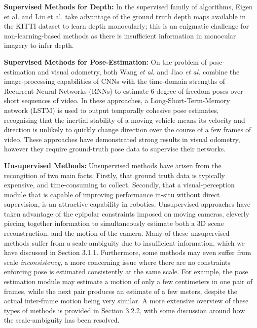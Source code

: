 \textbf{Supervised Methods for Depth: } In the supervised family of algorithms, Eigen et al. \cite{eigen2014supervised} and Liu et al. \cite{liu2015supervised} take advantage of the ground truth depth maps available in the KITTI dataset to learn depth monocularly; this is an enigmatic challenge for non-learning-based methods as there is insufficient information in monocular imagery to infer depth.

\textbf{Supervised Methods for Pose-Estimation: } On the problem of pose-estimation and visual odometry, both Wang \textit{et al.} \cite{wang2017deepvo} and Jiao \textit{et al.} \cite{jiao2018magicvo} combine the image-processing capabilities of CNNs with the time-domain strengths of Recurrent Neural Networks (RNNs) to estimate 6-degree-of-freedom poses over short sequences of video. In these approaches, a Long-Short-Term-Memory network (LSTM) is used to output temporally cohesive pose estimates, recognising that the inertial stability of a moving vehicle means its velocity and direction is unlikely to quickly change direction over the course of a few frames of video. These approaches have demonstrated strong results in visual odometry, however they require ground-truth pose data to supervise their networks.

\textbf{Unsupervised Methods: } Unsupervised methods have arisen from the recongition of two main facts. Firstly, that ground truth data is typically expensive, and time-consuming to collect. Secondly, that a visual-perception module that is capable of improving performance in-situ without direct supervision, is an attractive capability in robotics. Unsupervised approaches \cite{garg2016unsupervised,zhou2017unsupervised} have taken advantage of the epipolar constraints imposed on moving cameras, cleverly piecing together information to simultaneously estimate both a 3D scene reconstruction, and the motion of the camera. Many of these unsupervised methods suffer from a scale ambiguity due to insufficient information, which we have discussed in Section 3.1.1. Furthermore, some methods may even suffer from scale \textit{inconsistency}, a more concerning issue where there are no constraints enforcing pose is estimated consistently at the same scale. For example, the pose estimation module may estimate a motion of only a few centimeters in one pair of frames, while the next pair produces an estimate of a few meters, despite the actual inter-frame motion being very similar. A more extensive overview of these types of methods is provided in Section 3.2.2, with some discussion around how the scale-ambiguity has been resolved.


